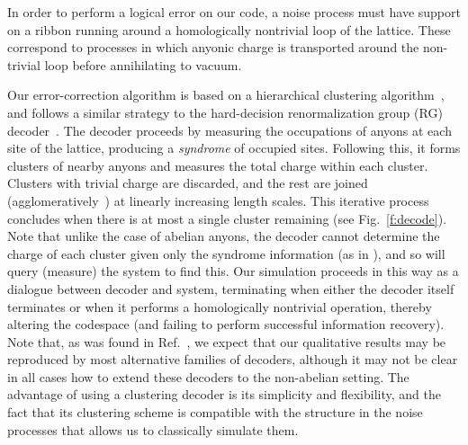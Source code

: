 \documentclass[aps, prl, letterpaper, twocolumn, superscriptaddress, notitlepage, 10pt]{revtex4-1}
\newcommand{\Fref}[1]{Fig.~\ref{#1}}
\newcommand{\cggb}[1]{\textcolor{blue}{#1}}
\newcommand{\dude}[1]{\textcolor{red}{#1}}
\begin{document}
In order to perform a logical error on our code, a noise process must have support on a 
ribbon running around a homologically nontrivial loop of the lattice. These correspond to 
processes in which anyonic charge is transported around the non-trivial loop before 
annihilating to vacuum.

Our error-correction algorithm is
based on a hierarchical clustering algorithm~\cite{Hastie2009},
and follows a similar strategy to the hard-decision renormalization group (RG) decoder~\cite{Bravyi2011}. 
The decoder proceeds by measuring the occupations of 
anyons at each site of the lattice, producing a \emph{syndrome} of occupied sites. Following this, it forms clusters of nearby anyons and 
measures the total charge within each cluster.
Clusters with trivial charge are discarded, and
the rest are joined (agglomeratively~\cite{Hastie2009})
at linearly increasing length scales. This iterative process concludes when there is at most a single cluster remaining (see \Fref{f:decode}).
Note that unlike the case of abelian anyons, the decoder
cannot determine the charge of each cluster given only the syndrome information (as in \cite{Bravyi2011}),
and so will query (measure) the system to find this.
Our simulation proceeds in this way as a dialogue between decoder
and system, terminating when either the decoder itself terminates or when it performs a homologically nontrivial operation, thereby altering the codespace (and failing to perform successful information recovery).
Note that, as was found in Ref.~\cite{Brell2013}, we expect that our qualitative results may be reproduced by most alternative families of decoders, although it may not be clear in all cases how to extend these decoders to the non-abelian setting.
The advantage of using a clustering decoder is 
its simplicity and flexibility, and the fact that its clustering scheme is compatible with the structure in the noise processes that allows us to classically simulate them.
\end{document}
